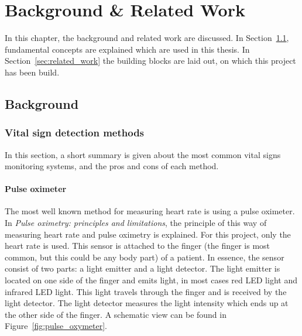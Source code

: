 \chapter{Background \& Related Work}
\label{chp:background}

In this chapter, the background and related work are discussed. In Section~\ref{sec:background}, fundamental concepts are explained which are used in this thesis. In Section~\ref{sec:related_work} the building blocks are laid out, on which this project has been build.

\section{Background}
\label{sec:background}
\subsection{Vital sign detection methods}
In this section, a short summary is given about the most common vital signs monitoring systems, and the pros and cons of each method.


\subsubsection{Pulse oximeter}
\label{sec:spo2_sensors}
The most well known method for measuring heart rate is using a pulse oximeter. In \emph{Pulse oximetry: principles and limitations}\cite{sinex1999pulse}, the principle of this way of measuring heart rate and pulse oximetry is explained. For this project, only the heart rate is used. This sensor is attached to the finger (the finger is most common, but this could be any body part) of a patient. In essence, the sensor consist of two parts: a light emitter and a light detector. The light emitter is located on one side of the finger and emits light, in most cases red LED light and infrared LED light. This light travels through the finger and is received by the light detector. The light detector measures the light intensity which ends up at the other side of the finger. A schematic view can be found in Figure~\ref{fig:pulse_oxymeter}. 

